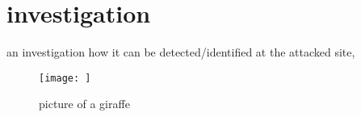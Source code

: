 
\section {investigation}
an investigation how it can be detected/identified at the attacked site,


\begin{figure}[h!]
\texttt{[image: ]}
\caption{picture of a giraffe}
\end{figure}